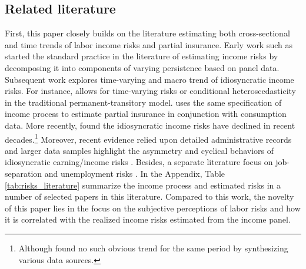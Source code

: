 
\hypertarget{related-literature}{%
\subsection{Related literature}\label{related-literature}}

First, this paper closely builds on the literature estimating both cross-sectional and time trends of labor income risks and partial insurance. Early work such as \cite{abowd1989covariance,gottschalk1994growth, carroll1997nature} started the standard practice in the literature of estimating income risks by decomposing it into components of varying persistence based on panel data. Subsequent work explores time-varying and macro trend of idiosyncratic income risks. For instance, \cite{meghir2004income} allows for time-varying risks or conditional heteroscedasticity in the traditional permanent-transitory model. \cite{blundell_consumption_2008} uses the same specification of income process to estimate partial insurance in conjunction with consumption data. More recently,  \cite{bloom2018great} found the idiosyncratic income risks have declined in recent decades.\footnote{Although  \cite{moffitt2020reconciling} found no such obvious trend for the same period by synthesizing various data sources.} Moreover, recent evidence relied upon detailed administrative records and larger data samples highlight the asymmetry and cyclical behaviors of idiosyncratic earning/income risks \citep{storesletten2004cyclical, guvenen2014nature,arellano2017earnings,guvenen2019data,bayer2019precautionary,guvenen2021data}. Besides, a separate literature focus on job-separation and unemployment risks \citep{low2010wage,davis2011recessions}. In the Appendix, Table \ref{tab:risks_literature} summarize the income process and estimated risks in a number of selected papers in this literature. Compared to this work, the novelty of this paper lies in the focus on the subjective perceptions of labor risks and how it is correlated with the realized income risks estimated from the income panel. 

